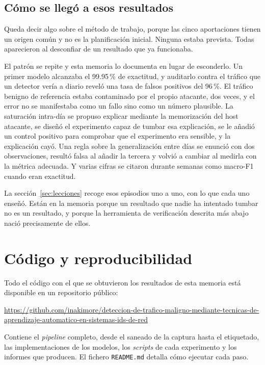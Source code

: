 \subsection*{Cómo se llegó a esos resultados}

Queda decir algo sobre el método de trabajo, porque las cinco aportaciones
tienen un origen común y no es la planificación inicial. Ninguna estaba prevista.
Todas aparecieron al desconfiar de un resultado que ya funcionaba.

El patrón se repite y esta memoria lo documenta en lugar de esconderlo. Un
primer modelo alcanzaba el 99.95\,\% de exactitud, y auditarlo contra el tráfico
que un detector vería a diario reveló una tasa de falsos positivos del 96\,\%. El
tráfico benigno de referencia estaba contaminado por el propio atacante, dos
veces, y el error no se manifestaba como un fallo sino como un número plausible.
La saturación intra-día se propuso explicar mediante la memorización del host
atacante, se diseñó el experimento capaz de tumbar esa explicación, se le añadió
un control positivo para comprobar que el experimento era sensible, y la
explicación cayó. Una regla sobre la generalización entre días se enunció con dos
observaciones, resultó falsa al añadir la tercera y volvió a cambiar al medirla
con la métrica adecuada. Y varias cifras se citaron durante semanas como macro-F1
cuando eran exactitud.

La sección~\ref{sec:lecciones} recoge esos episodios uno a uno, con lo que cada
uno enseñó. Están en la memoria porque un resultado que nadie ha intentado
tumbar no es un resultado, y porque la herramienta de verificación descrita más
abajo nació precisamente de ellos.

\section{Código y reproducibilidad}
\label{sec:repositorio}

Todo el código con el que se obtuvieron los resultados de esta memoria está
disponible en un repositorio público:

\begin{center}
\small
\url{https://github.com/inakimore/deteccion-de-trafico-maligno-mediante-tecnicas-de-aprendizaje-automatico-en-sistemas-ids-de-red}
\end{center}

Contiene el \emph{pipeline} completo, desde el saneado de la captura hasta el
etiquetado, las implementaciones de los modelos, los \emph{scripts} de cada
experimento y los informes que producen. El fichero \texttt{README.md} detalla
cómo ejecutar cada paso.

